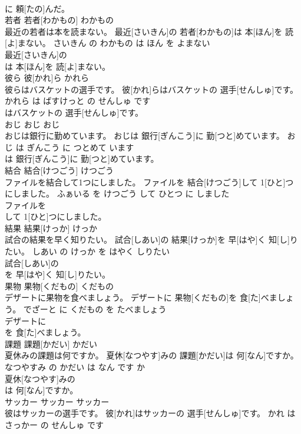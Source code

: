 \documentclass[8pt]{extreport}
\begin{document}
\begin{CJK}{UTF8}{min}
\\	に 頼[たの]んだ。			
\\	若者	若者[わかもの]	わかもの	
\\	最近の若者は本を読まない。	最近[さいきん]の 若者[わかもの]は 本[ほん]を 読[よ]まない。	さいきん の わかもの は ほん を よまない	
\\	最近[さいきん]の
\\	は 本[ほん]を 読[よ]まない。			
\\	彼ら	彼[かれ]ら	かれら	
\\	彼らはバスケットの選手です。	彼[かれ]らはバスケットの 選手[せんしゅ]です。	かれら は ばすけっと の せんしゅ です	
\\	はバスケットの 選手[せんしゅ]です。			
\\	おじ	おじ	おじ	
\\	おじは銀行に勤めています。	おじは 銀行[ぎんこう]に 勤[つと]めています。	おじ は ぎんこう に つとめて います	
\\	は 銀行[ぎんこう]に 勤[つと]めています。			
\\	結合	結合[けつごう]	けつごう	
\\	ファイルを結合して1つにしました。	ファイルを 結合[けつごう]して 1[ひと]つにしました。	ふぁいる を けつごう して ひとつ に しました	
\\	ファイルを
\\	して 1[ひと]つにしました。			
\\	結果	結果[けっか]	けっか	
\\	試合の結果を早く知りたい。	試合[しあい]の 結果[けっか]を 早[はや]く 知[し]りたい。	しあい の けっか を はやく しりたい	
\\	試合[しあい]の
\\	を 早[はや]く 知[し]りたい。			
\\	果物	果物[くだもの]	くだもの	
\\	デザートに果物を食べましょう。	デザートに 果物[くだもの]を 食[た]べましょう。	でざーと に くだもの を たべましょう	
\\	デザートに
\\	を 食[た]べましょう。			
\\	課題	課題[かだい]	かだい	
\\	夏休みの課題は何ですか。	夏休[なつやす]みの 課題[かだい]は 何[なん]ですか。	なつやすみ の かだい は なん です か	
\\	夏休[なつやす]みの
\\	は 何[なん]ですか。			
\\	サッカー	サッカー	サッカー	
\\	彼はサッカーの選手です。	彼[かれ]はサッカーの 選手[せんしゅ]です。	かれ は さっかー の せんしゅ です	

\end{CJK}
\end{document}
